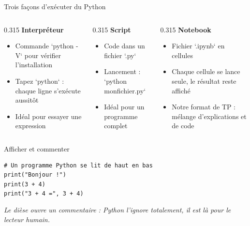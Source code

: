 \documentclass[aspectratio=169,11pt]{beamer}
\begin{document}
\begin{frame}{Trois façons d'exécuter du Python}
\begin{columns}[t]
\begin{column}{0.315\textwidth}
{\bfseries\color{PyBleu}Interpréteur}

\begin{itemize}
  \setlength{\itemsep}{1.5pt}\setlength{\parskip}{0pt}
  \item Commande `python -V` pour vérifier l'installation
  \item Tapez `python` : chaque ligne s'exécute aussitôt
  \item Idéal pour essayer une expression
\end{itemize}
\end{column}
\hspace{0.015\textwidth}
\begin{column}{0.315\textwidth}
{\bfseries\color{PyBleu}Script}

\begin{itemize}
  \setlength{\itemsep}{1.5pt}\setlength{\parskip}{0pt}
  \item Code dans un fichier `.py`
  \item Lancement : `python monfichier.py`
  \item Idéal pour un programme complet
\end{itemize}
\end{column}
\hspace{0.015\textwidth}
\begin{column}{0.315\textwidth}
{\bfseries\color{PyBleu}Notebook}

\begin{itemize}
  \setlength{\itemsep}{1.5pt}\setlength{\parskip}{0pt}
  \item Fichier `.ipynb` en cellules
  \item Chaque cellule se lance seule, le résultat reste affiché
  \item Notre format de TP : mélange d'explications et de code
\end{itemize}
\end{column}
\end{columns}
\end{frame}

\begin{frame}[fragile]{Afficher et commenter}

\begin{lstlisting}[style=py]
# Un programme Python se lit de haut en bas
print("Bonjour !")
print(3 + 4)
print("3 + 4 =", 3 + 4)
\end{lstlisting}
\vspace{0.5pt}

{\small\color{PyGris}\itshape Le dièse ouvre un commentaire : Python l'ignore totalement, il est là pour le lecteur humain.}

\end{frame}
\end{document}
